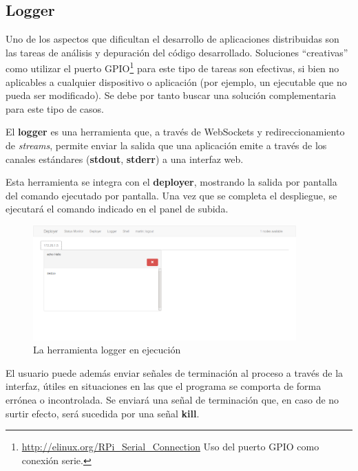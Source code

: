 
\subsection{Logger}

Uno de los aspectos que dificultan el desarrollo de aplicaciones distribuidas son las tareas de análisis y depuración del código desarrollado. Soluciones ``creativas'' como utilizar el puerto GPIO\footnote{\href{http://elinux.org/RPi\_Serial\_Connection}{http://elinux.org/RPi\_Serial\_Connection} Uso del puerto GPIO como conexión serie.} para este tipo de tareas son efectivas, si bien no aplicables a cualquier dispositivo o aplicación (por ejemplo, un ejecutable que no pueda ser modificado). Se debe por tanto buscar una solución complementaria para este tipo de casos.

El \textbf{logger} es una herramienta que, a través de WebSockets y redireccionamiento de \textit{streams}, permite enviar la salida que una aplicación emite a través de los canales estándares (\textbf{stdout}, \textbf{stderr}) a una interfaz web.

Esta herramienta se integra con el \textbf{deployer}, mostrando la salida por pantalla del comando ejecutado por pantalla. Una vez que se completa el despliegue, se ejecutará el comando indicado en el panel de subida.

\begin{figure}[H]
\centering
\includegraphics[width=0.9\textwidth]{Chapters/Chapter5/Figures/logger-deployer}
\caption[La herramienta logger en ejecución]{La herramienta logger en ejecución}
\end{figure}

El usuario puede además enviar señales de terminación al proceso a través de la interfaz, útiles en situaciones en las que el programa se comporta de forma errónea o incontrolada. Se enviará una señal de terminación que, en caso de no surtir efecto, será sucedida por una señal \textbf{kill}. 


